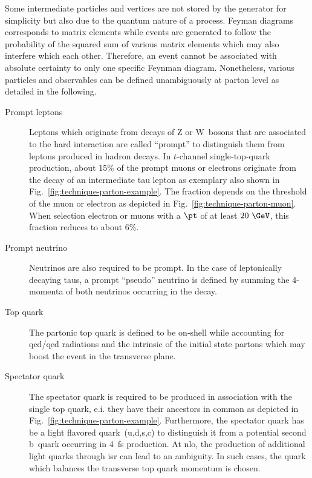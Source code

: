 Some intermediate particles and vertices are not stored by the generator for simplicity but also due to the quantum nature of a process. Feyman diagrams corresponds to matrix elements while events are generated to follow the probability of the squared sum of various matrix elements which may also interfere which each other. Therefore, an event cannot be associated with absolute certainty to only one specific Feynman diagram. Nonetheless, various particles and observables can be defined unambiguously at parton level as detailed in the following.
\begin{description}
\item[Prompt leptons] Leptons which originate from decays of Z or W~bosons that are associated to the hard interaction are called ``prompt'' to distinguish them from leptons produced in hadron decays. In $t$-channel single-top-quark production, about 15\% of the prompt muons or electrons originate from the decay of an intermediate tau lepton as exemplary also shown in Fig.~\ref{fig:technique-parton-example}. The fraction depends on the \pt threshold of the muon or electron as depicted in Fig.~\ref{fig:technique-parton-muon}. When selection electron or muons with a $\pt$ of at least $20~\GeV$, this fraction reduces to about 6\%.
\item[Prompt neutrino] Neutrinos are also required to be prompt. In the case of leptonically decaying taus, a prompt ``pseudo'' neutrino is defined by summing the 4-momenta of both neutrinos occurring in the decay.
\item[Top quark] The partonic top quark is defined to be on-shell while accounting for \gls{qcd}/\gls{qed} radiations and the intrinsic \kt of the initial state partons which may boost the event in the transverse plane.
\item[Spectator quark] The spectator quark is required to be produced in association with the single top quark, e.i. they have their ancestors in common as depicted in Fig.~\ref{fig:technique-parton-example}. Furthermore, the spectator quark has be a light flavored quark~(u,d,s,c) to distinguish it from a potential second b~quark occurring in 4~\gls{fs} production. At \gls{nlo}, the production of additional light quarks through \gls{isr} can lead to an ambiguity. In such cases, the quark which balances the transverse top quark momentum is chosen.
\end{description}

